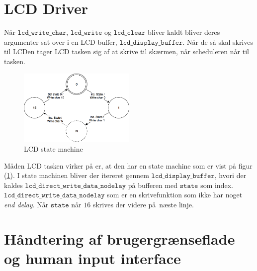 \section{LCD Driver}
\label{sec:LCD_driver}
Når $\mathtt{lcd\_write\_char}$, $\mathtt{lcd\_write}$ og $\mathtt{lcd\_clear}$ bliver kaldt bliver deres argumenter sat over i en LCD buffer, $\mathtt{lcd\_display\_buffer}$.
Når de så skal skrives til LCDen tager LCD tasken sig af at skrive til skærmen, når scheduleren når til tasken.
\begin{figure}[!ht]
	\centering
	\includegraphics[width=0.5\textwidth]{billeder/lcd_state_machine.png}
	\caption{LCD state machine}
	\label{fig:LCD_state_machine}
\end{figure}
\newline
Måden LCD tasken virker på er, at den har en state machine som er vist på figur (\ref{fig:LCD_state_machine}).\newline
I state machinen bliver der itereret gennem $\mathtt{lcd\_display\_buffer}$, hvori der kaldes $\mathtt{lcd\_direct\_write\_data\_nodelay}$ på bufferen med $\mathtt{state}$ som index.\newline
$\mathtt{lcd\_direct\_write\_data\_nodelay}$ som er en skrivefunktion som ikke har noget \textit{end delay}.
Når $\mathtt{state}$ når $16$ skrives der videre på næste linje.

\section{Håndtering af brugergrænseflade og human input interface}
\label{sec:HID}

